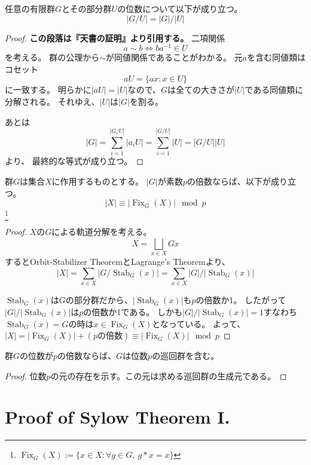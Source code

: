 \documentclass[a4paper]{jsarticle}
\newcommand{\Stab}{\operatorname{Stab}}
\newcommand{\Fix}{\operatorname{Fix}}
\begin{document}
    \begin{Them}
        任意の有限群$G$とその部分群$U$の位数について以下が成り立つ。
        \[ |G/U|=|G|/|U| \]
    \end{Them}
    \begin{proof}
        \textbf{この段落は『天書の証明』より引用する。}
        二項関係\[ a \sim b \iff ba^{-1} \in U \]を考える。
        群の公理から$\sim$が同値関係であることがわかる。
        元$a$を含む同値類はコセット\[ aU=\{ ax : x \in U \} \]に一致する。
        明らかに$|aU|=|U|$なので、$G$は全ての大きさが$|U|$である同値類に分解される。
        それゆえ、$|U|$は$|G|$を割る。

        あとは
        \[ |G|=\sum_{i=1}^{|G/U|}{|a_i U|}=\sum_{i=1}^{|G/U|}{|U|}=|G/U||U| \]より、
        最終的な等式が成り立つ。
        
    \end{proof}

    \begin{Lemma}
        群$G$は集合$X$に作用するものとする。
        $|G|$が素数$p$の倍数ならば、以下が成り立つ。
        \[ |X| \equiv |\Fix_G(X)| \mod p\]
        \footnote{$\Fix_G(X):=\{x \in X : \forall g \in G,~ g \ast x=x \}$}
    \end{Lemma}
    \begin{proof}
        $X$の$G$による軌道分解を考える。
        \[ X= \bigsqcup_{x \in X}{Gx} \]
        するとOrbit-Stabilizer TheoremとLagrange's Theoremより、
        \[ |X| = \sum_{x \in X}{|G/ \Stab_G(x)|} = \sum_{x \in X}{|G|/|\Stab_G(x)|}\]

        $\Stab_G(x)$は$G$の部分群だから、$|\Stab_G(x)|$も$p$の倍数か1。
        したがって$|G|/|\Stab_G(x)|$は$p$の倍数か1である。
        しかも$|G|/|\Stab_G(x)|=1$すなわち$\Stab_G(x)=G$の時は$x \in \Fix_G(X)$となっている。
        よって、$|X|=|\Fix_G(X)|+(p\mbox{の倍数}) \equiv |\Fix_G(X)| \mod p$
        
    \end{proof}

    \begin{Them}
        群$G$の位数が$p$の倍数ならば、$G$は位数$p$の巡回群を含む。
    \end{Them}
    \begin{proof}
        位数$p$の元の存在を示す。この元は求める巡回群の生成元である。
    \end{proof}

\section{Proof of Sylow Theorem I.}
\end{document}
